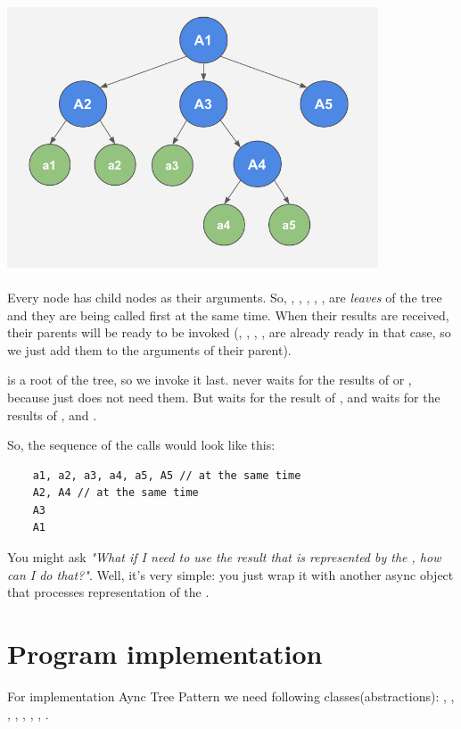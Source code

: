 \documentclass{article}
\begin{document}
\vspace*{10px}
\includegraphics[width=11cm, height=8cm]{async-tree.png}

\newpage
Every node has child nodes as their arguments. So, , , , , ,  are \textit{leaves} of the tree and they are being called first at the same time. When their results are received, their parents will be ready to be invoked (, , , ,  are already ready in that case, so we just add them to the arguments of their parent).

 is a root of the tree, so we invoke it last.  never waits for the results of  or , because  just does not need them. But  waits for the result of , and  waits for the results of ,  and .

So, the sequence of the calls would look like this:

\begin{verbatim}
    a1, a2, a3, a4, a5, A5 // at the same time
    A2, A4 // at the same time
    A3
    A1
\end{verbatim}

You might ask \textit{"What if I need to use the result that is represented by the , how can I do that?"}. Well, it's very simple: you just wrap it with another async object that processes representation of the .

\section{Program implementation}

For implementation Aync Tree Pattern we need following classes(abstractions): , ,
, , , , , .
\end{document}
